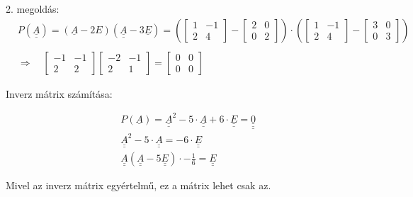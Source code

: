 \vspace{2mm}
2. megoldás:
$$
\begin{aligned}
&P(\underline{\underline{A}})=(\underline{A}-2 E)(\underline{\underline{A}}-3 \underline{E})=
\left(\left[\begin{array}{cc}
1 & -1 \\
2 & 4
\end{array}\right]
-\left[\begin{array}{ll}2 & 0 \\0 & 2\end{array}\right]\right) \cdot\left(\left[\begin{array}{cc}1 & -1 \\2 & 4\end{array}\right]-\left[\begin{array}{ll}3 & 0 \\0 & 3\end{array}\right]\right) \\
\\
& \Rightarrow \quad\left[\begin{array}{cc}-1 & -1 \\2 & 2\end{array}\right]\left[\begin{array}{cc}-2 & -1 \\2 & 1\end{array}\right] = \left[\begin{array}{ll}0 & 0 \\0 & 0\end{array}\right]
\end{aligned}
$$

Inverz mátrix számítása:

$$
\begin{aligned}
& P(\underline{A})=\underline{\underline{A}}^{2}-5 \cdot \underline{\underline{A}}+6 \cdot \underline{\underline{E}}=\underline{\underline{\underline{0}}} \\
& \underline{\underline{A}}^2 - 5 \cdot \underline{\underline{A}} = -6 \cdot \underline{\underline{E}} \\
& \underline{\underline{A}}(\underline{\underline{A}} - 5 \underline{\underline{E}}) \cdot -\frac{1}{6} = \underline{\underline{E}}
\end{aligned}
$$

Mivel az inverz mátrix egyértelmű, ez a mátrix lehet csak az.

